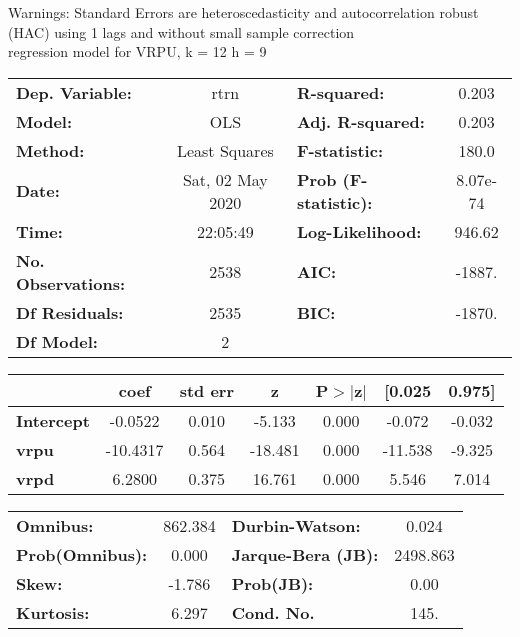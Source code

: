 Warnings: \newline
 [1] Standard Errors are heteroscedasticity and autocorrelation robust (HAC) using 1 lags and without small sample correction\\ 

regression model for VRPU, k = 12 h = 9\begin{center}
\begin{tabular}{lclc}
\toprule
\textbf{Dep. Variable:}    &       rtrn       & \textbf{  R-squared:         } &     0.203   \\
\textbf{Model:}            &       OLS        & \textbf{  Adj. R-squared:    } &     0.203   \\
\textbf{Method:}           &  Least Squares   & \textbf{  F-statistic:       } &     180.0   \\
\textbf{Date:}             & Sat, 02 May 2020 & \textbf{  Prob (F-statistic):} &  8.07e-74   \\
\textbf{Time:}             &     22:05:49     & \textbf{  Log-Likelihood:    } &    946.62   \\
\textbf{No. Observations:} &        2538      & \textbf{  AIC:               } &    -1887.   \\
\textbf{Df Residuals:}     &        2535      & \textbf{  BIC:               } &    -1870.   \\
\textbf{Df Model:}         &           2      & \textbf{                     } &             \\
\bottomrule
\end{tabular}
\begin{tabular}{lcccccc}
                   & \textbf{coef} & \textbf{std err} & \textbf{z} & \textbf{P$> |$z$|$} & \textbf{[0.025} & \textbf{0.975]}  \\
\midrule
\textbf{Intercept} &      -0.0522  &        0.010     &    -5.133  &         0.000        &       -0.072    &       -0.032     \\
\textbf{vrpu}      &     -10.4317  &        0.564     &   -18.481  &         0.000        &      -11.538    &       -9.325     \\
\textbf{vrpd}      &       6.2800  &        0.375     &    16.761  &         0.000        &        5.546    &        7.014     \\
\bottomrule
\end{tabular}
\begin{tabular}{lclc}
\textbf{Omnibus:}       & 862.384 & \textbf{  Durbin-Watson:     } &    0.024  \\
\textbf{Prob(Omnibus):} &   0.000 & \textbf{  Jarque-Bera (JB):  } & 2498.863  \\
\textbf{Skew:}          &  -1.786 & \textbf{  Prob(JB):          } &     0.00  \\
\textbf{Kurtosis:}      &   6.297 & \textbf{  Cond. No.          } &     145.  \\
\bottomrule
\end{tabular}
\end{center}

